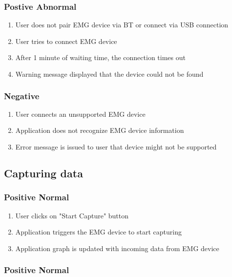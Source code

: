 \documentclass[12pt,a4paper]{article}
\begin{document}
\subsubsection{Postive Abnormal}

\begin{enumerate}
	\item User does not pair EMG device via BT or connect via USB connection
	\item User tries to connect EMG device
	\item After 1 minute of waiting time, the connection times out
	\item Warning message displayed that the device could not be found
\end{enumerate}

\subsubsection{Negative}

\begin{enumerate}
	\item User connects an unsupported EMG device
	\item Application does not recognize EMG device information
	\item Error message is issued to user that device might not be supported
\end{enumerate}

\subsection{Capturing data}

\subsubsection{Positive Normal}

\begin{enumerate}
	\item User clicks on "Start Capture" button
	\item Application triggers the EMG device to start capturing
	\item Application graph is updated with incoming data from EMG device
\end{enumerate}

\subsubsection{Positive Normal}
\end{document}
